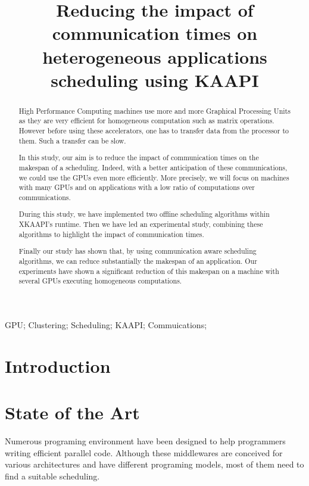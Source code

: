 \documentclass[10pt, conference, compsocconf]{IEEEtran}
\author{\IEEEauthorblockN{David Beniamine, Guillaume Huard, Denis Trystramn}
\IEEEauthorblockA{Grenoble Informatics Laboratory (LIG)\\
Inria\\
Grenoble, France\\
david.beniamine@imag.fr, guillaume.huard@imag.fr, denis.trystramn@imag.fr}
}
\title{Reducing the impact of communication times on heterogeneous
applications scheduling using KAAPI }
\begin{document}

\maketitle%
\begin{abstract}
    High Performance Computing machines use more and more
    Graphical Processing Units as they are very efficient for homogeneous 
    computation such as matrix operations. However before using these 
    accelerators, one has to transfer data from the processor to them. Such a
    transfer can be slow. 

    In this study, our aim is to reduce the impact of communication times on
    the makespan of a scheduling. Indeed, with a better anticipation of these
    communications, we could use the GPUs even more efficiently. More
    precisely, we will focus on machines with many GPUs and on
    applications with a low ratio of computations over communications. 

    During this study, we have implemented two offline scheduling algorithms
    within  XKAAPI's runtime. Then we have led an experimental study, combining 
    these algorithms to highlight the impact of communication times.

    Finally our study has shown that, by using communication aware scheduling
    algorithms, we can reduce substantially the makespan of an application.
    Our experiments have shown a significant reduction of this makespan on a
    machine with several GPUs executing homogeneous computations.

\end{abstract}

\begin{IEEEkeywords}
GPU; Clustering; Scheduling; KAAPI; Commuications;

\end{IEEEkeywords}




\section{Introduction}
\section{State of the Art}
Numerous programing environment have been designed to help programmers writing
efficient parallel code. Although these middlewares are conceived for various
architectures and have different programing models, most of them need to find a
suitable scheduling.
\end{document}
